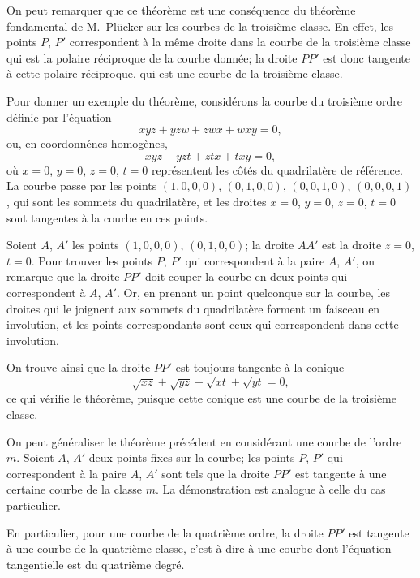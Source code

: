 \documentclass[11pt,a4paper]{book}
\begin{document}
On peut remarquer que ce th\'{e}or\`{e}me est une cons\'{e}quence du th\'{e}or\`{e}me fondamental
de M.~Pl\"{u}cker sur les courbes de la troisi\`{e}me classe. En effet, les points $P$, $P'$ correspondent
\`{a} la m\^{e}me droite dans la courbe de la troisi\`{e}me classe qui est la polaire r\'{e}ciproque de la
courbe donn\'{e}e; la droite $PP'$ est donc tangente \`{a} cette polaire r\'{e}ciproque, qui est une
courbe de la troisi\`{e}me classe.

\newpage
\setcounter{page}{189}

Pour donner un exemple du th\'{e}or\`{e}me, consid\'{e}rons la courbe du troisi\`{e}me ordre
d\'{e}finie par l'\'{e}quation
\[
xyz + yzw + zwx + wxy = 0,
\]
ou, en coordonn\'{e}nes homog\`{e}nes,
\[
xyz + yzt + ztx + txy = 0,
\]
o\`{u} $x=0$, $y=0$, $z=0$, $t=0$ repr\'{e}sentent les c\^{o}t\'{e}s du quadrilat\`{e}re de r\'{e}f\'{e}rence. La
courbe passe par les points $(1,0,0,0)$, $(0,1,0,0)$, $(0,0,1,0)$, $(0,0,0,1)$, qui sont les
sommets du quadrilat\`{e}re, et les droites $x=0$, $y=0$, $z=0$, $t=0$ sont tangentes \`{a} la courbe
en ces points.

Soient $A$, $A'$ les points $(1,0,0,0)$, $(0,1,0,0)$; la droite $AA'$ est la droite $z=0$, $t=0$.
Pour trouver les points $P$, $P'$ qui correspondent \`{a} la paire $A$, $A'$, on remarque que la
droite $PP'$ doit couper la courbe en deux points qui correspondent \`{a} $A$, $A'$. Or, en
prenant un point quelconque sur la courbe, les droites qui le joignent aux sommets du
quadrilat\`{e}re forment un faisceau en involution, et les points correspondants sont ceux
qui correspondent dans cette involution.

On trouve ainsi que la droite $PP'$ est toujours tangente \`{a} la conique
\[
\sqrt{xz} + \sqrt{yz} + \sqrt{xt} + \sqrt{yt} = 0,
\]
ce qui v\'{e}rifie le th\'{e}or\`{e}me, puisque cette conique est une courbe de la troisi\`{e}me classe.

\newpage
\setcounter{page}{190}

On peut g\'{e}n\'{e}raliser le th\'{e}or\`{e}me pr\'{e}c\'{e}dent en consid\'{e}rant une courbe de l'ordre $m$.
Soient $A$, $A'$ deux points fixes sur la courbe; les points $P$, $P'$ qui correspondent \`{a}
la paire $A$, $A'$ sont tels que la droite $PP'$ est tangente \`{a} une certaine courbe de la
classe $m$. La d\'{e}monstration est analogue \`{a} celle du cas particulier.

En particulier, pour une courbe de la quatri\`{e}me ordre, la droite $PP'$ est tangente
\`{a} une courbe de la quatri\`{e}me classe, c'est-\`{a}-dire \`{a} une courbe dont l'\'{e}quation tangentielle
est du quatri\`{e}me degr\'{e}.
\end{document}
